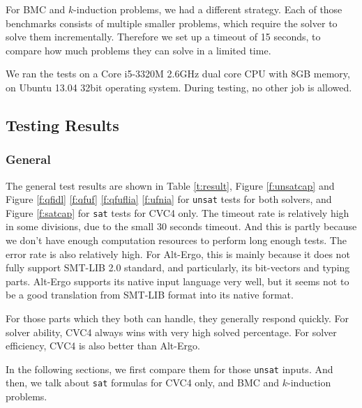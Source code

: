 \documentclass[10pt,letter]{article}
\theoremstyle{definition}
\begin{document}
For BMC and $k$-induction problems, we had a different strategy. Each of those benchmarks consists of multiple smaller problems, which require the solver to solve them incrementally. Therefore we set up a timeout of 15 seconds, to compare how much problems they can solve in a limited time.

We ran the tests on a Core i5-3320M 2.6GHz dual core CPU with 8GB memory, on Ubuntu 13.04 32bit operating system. During testing, no other job is allowed.



\subsection{Testing Results}

\subsubsection{General}

The general test results are shown in Table \ref{t:result}, Figure \ref{f:unsatcap} and Figure \ref{f:qfidl} \ref{f:qfuf} \ref{f:qfuflia} \ref{f:ufnia} for {\tt unsat} tests for both solvers, and Figure \ref{f:satcap} for {\tt sat} tests for CVC4 only. The timeout rate is relatively high in some divisions, due to the small 30 seconds timeout. And this is partly because we don't have enough computation resources to perform long enough tests. The error rate is also relatively high. For Alt-Ergo, this is mainly because it does not fully support SMT-LIB 2.0 standard, and particularly, its bit-vectors and typing parts. Alt-Ergo supports its native input language very well, but it seems not to be a good translation from SMT-LIB format into its native format. 

For those parts which they both can handle, they generally respond quickly. For solver ability, CVC4 always wins with very high solved percentage. For solver efficiency, CVC4 is also better than Alt-Ergo.

In the following sections, we first compare them for those {\tt unsat} inputs. And then, we talk about {\tt sat} formulas for CVC4 only, and BMC and $k$-induction problems.
\end{document}
